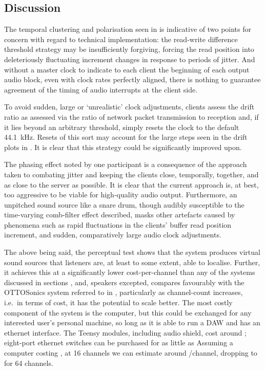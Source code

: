 \subsection{Discussion}\label{subsec:discussion}

The temporal clustering and polarisation seen in
 is indicative of two points for
concern with regard to technical implementation:
the read-write difference threshold strategy may be insufficiently forgiving,
forcing the read position into deleteriously fluctuating increment changes in
response to periods of jitter.
And without a master clock to indicate to each client the beginning of each
output audio block, even with clock rates perfectly aligned, there is nothing
to guarantee agreement of the timing of audio interrupts at the client side.

To avoid sudden, large or `unrealistic' clock adjustments, clients assess
the drift ratio as assessed via the ratio of network packet
transmission to reception and, if it lies beyond an arbitrary threshold,
simply resets the clock to the default \qty{44.1}{\kHz}.
Resets of this sort may account for the large steps seen in the drift plots
in .
It is clear that this strategy could be significantly improved upon.

The phasing effect noted by one participant is a  consequence of the approach
taken to combating jitter and keeping the clients close, temporally, together,
and as close to the server as possible.
It is clear that the current approach is, at best, too aggressive to be viable
for high-quality audio output.
Furthermore, an unpitched sound source like a snare drum, though audibly
susceptible to the time-varying comb-filter effect described, masks other
artefacts caused by phenomena such as rapid fluctuations in the clients' buffer
read position increment, and sudden, comparatively large audio clock
adjustments.

The above being said, the perceptual test shows that the system produces virtual
sound sources that listeners are, at least to some extent, able to localise.
Further, it achieves this at a significantly lower cost-per-channel than any of
the systems discussed in sections , and, speakers
excepted, compares favourably with the OTTOSonics system referred to in
, particularly as channel-count
increases, i.e.\ in terms of cost, it has the potential to scale better.
The most costly component of the system is the computer, but this could be
exchanged for any interested user's personal machine, so long as it is able to
run a DAW and has an ethernet interface.
The Teensy modules, including audio shield, cost around ;
eight-port ethernet switches can be purchased for as little as 
Assuming a computer costing , at 16 channels we can estimate
around /channel, dropping to  for 64 channels.
